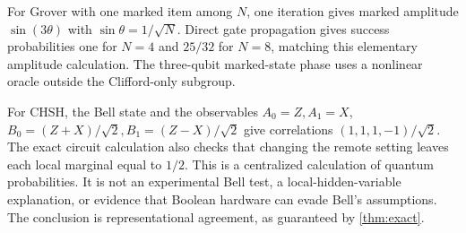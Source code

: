 For Grover with one marked item among $N$, one iteration gives marked amplitude $\sin(3\theta)$ with $\sin\theta=1/\sqrt N$. Direct gate propagation gives success probabilities one for $N=4$ and $25/32$ for $N=8$, matching this elementary amplitude calculation. The three-qubit marked-state phase uses a nonlinear oracle outside the Clifford-only subgroup.

For CHSH, the Bell state and the observables $A_0=Z,A_1=X$, $B_0=(Z+X)/\sqrt2,B_1=(Z-X)/\sqrt2$ give correlations $(1,1,1,-1)/\sqrt2$. The exact circuit calculation also checks that changing the remote setting leaves each local marginal equal to $1/2$. This is a centralized calculation of quantum probabilities. It is not an experimental Bell test, a local-hidden-variable explanation, or evidence that Boolean hardware can evade Bell's assumptions. The conclusion is representational agreement, as guaranteed by \cref{thm:exact}.
